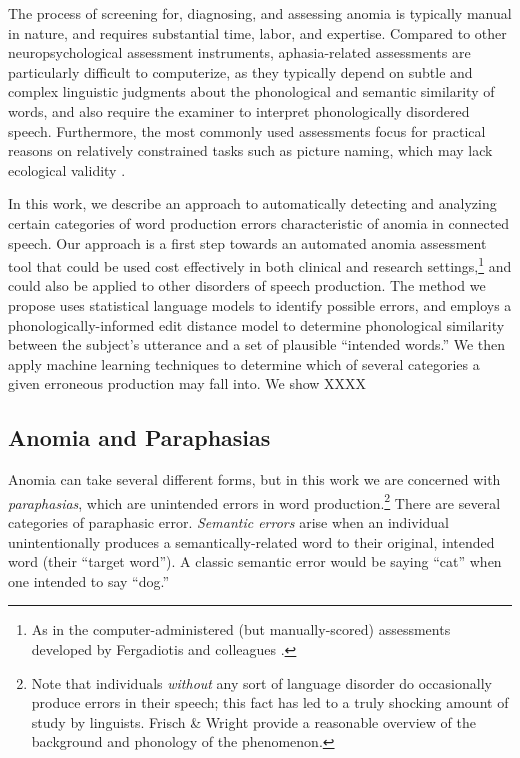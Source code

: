 The process of screening for, diagnosing, and assessing anomia is typically manual in nature, and requires substantial time, labor, and expertise.
Compared to other neuropsychological assessment instruments, aphasia-related assessments are particularly difficult to computerize, as they typically depend on subtle and complex linguistic judgments about the phonological and semantic similarity of words, and also require the examiner to interpret phonologically disordered speech.
Furthermore, the most commonly used assessments focus for practical reasons on relatively constrained tasks such as picture naming, which may lack ecological validity \cite{Mayer:2003kp}.

In this work, we describe an approach to automatically detecting and analyzing certain categories of word production errors characteristic of anomia in connected speech.
Our approach is a first step towards an automated anomia assessment tool that could be used cost effectively in both clinical and research settings,\footnote{As in the computer-administered (but manually-scored) assessments developed by Fergadiotis and colleagues \cite{Fergadiotis:2015gp,Hula:2015kz}. } and could also be applied to other disorders of speech production.
The method we propose uses statistical language models to identify possible errors, and employs a phonologically-informed edit distance model to determine phonological similarity between the subject's utterance and a set of plausible ``intended words.''
We then apply machine learning techniques to determine which of several categories a given erroneous production may fall into.
We show XXXX %

\subsection{Anomia and Paraphasias} %
\label{sub:anomia_and_paraphasias}


Anomia can take several different forms, but in this work we are concerned with \emph{paraphasias},
which are unintended errors in word production.\footnote{Note that individuals \emph{without} any sort of language disorder do occasionally produce errors in their speech; this fact has led to a truly shocking amount of study by linguists.
Frisch \& Wright  provide a reasonable overview of the background and phonology of the phenomenon.} %
There are several categories of paraphasic error. \emph{Semantic errors} arise when an individual unintentionally produces a semantically-related word to their original, intended word (their ``target word'').
A classic semantic error would be saying ``cat'' when one intended to say ``dog.''

